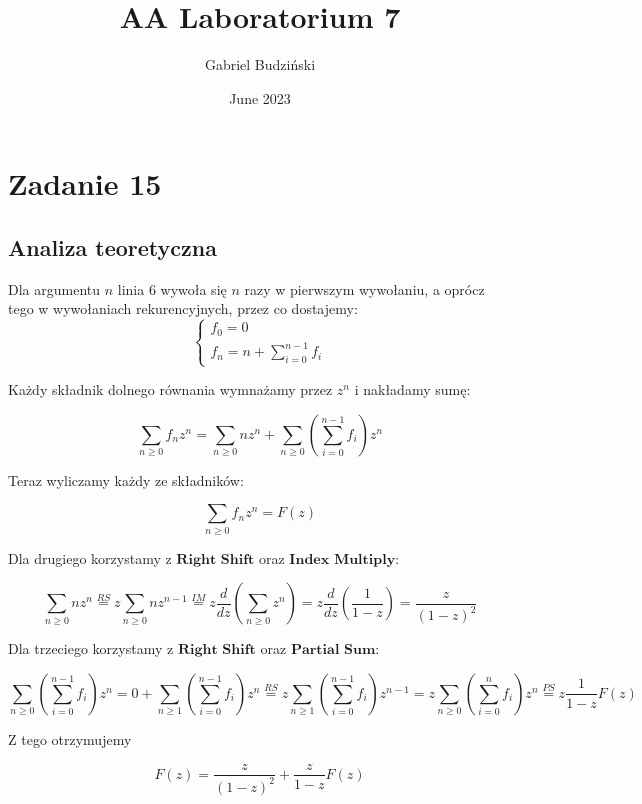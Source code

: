 \documentclass{article}
\title{AA Laboratorium 7}
\author{Gabriel Budziński}
\date{June 2023}
\begin{document}
\maketitle

\section{Zadanie 15}

\subsection{Analiza teoretyczna}

Dla argumentu $n$ linia 6 wywoła się $n$ razy w pierwszym wywołaniu, a oprócz tego w wywołaniach rekurencyjnych, przez co dostajemy:
\begin{equation}
    \begin{cases}
        f_0 = 0\\
        f_n = n + \sum\limits_{i=0}^{n-1}{f_i}
    \end{cases}
\end{equation}

Każdy składnik dolnego równania wymnażamy przez $z^n$ i nakładamy sumę:

\[\sum\limits_{n \geq 0}{f_n z^n} = \sum\limits_{n \geq 0}{nz^n} + \sum\limits_{n \geq 0}{\left(\sum\limits_{i=0}^{n-1}{f_i}\right)z^n}\]

Teraz wyliczamy każdy ze składników:

\[\sum\limits_{n \geq 0}{f_n z^n} = F(z)\]

Dla drugiego korzystamy z $\textbf{Right Shift}$ oraz $\textbf{Index Multiply}$:

\[\sum\limits_{n \geq 0}{nz^n} \stackrel{RS}{=} z\sum\limits_{n \geq 0}{nz^{n-1}} \stackrel{IM}{=} z\frac{d}{dz}\left(\sum\limits_{n \geq 0}{z^n}\right) = z\frac{d}{dz}\left(\frac{1}{1-z}\right) = \frac{z}{{(1-z)}^2}\]

Dla trzeciego korzystamy z $\textbf{Right Shift}$ oraz $\textbf{Partial Sum}$:

\[\sum\limits_{n \geq 0}{\left(\sum\limits_{i=0}^{n-1}{f_i}\right)z^n} = 0 + \sum\limits_{n \geq 1}{\left(\sum\limits_{i=0}^{n-1}{f_i}\right)z^n} \stackrel{RS}{=} z\sum\limits_{n \geq 1}{\left(\sum\limits_{i=0}^{n-1}{f_i}\right)z^{n-1}} = z\sum\limits_{n \geq 0}{\left(\sum\limits_{i=0}^{n}{f_i}\right)z^n} \stackrel{PS}{=} z\frac{1}{1-z}F(z)\]

Z tego otrzymujemy

\[F(z) = \frac{z}{{(1-z)}^2} + \frac{z}{1-z}F(z)\]
\end{document}
